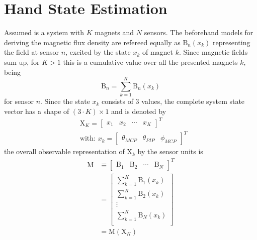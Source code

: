 \section{Hand State Estimation} \label{sec:estimation}

Assumed is a system with $ K $ magnets and $ N $ sensors. The beforehand models for deriving the magnetic flux density are refereed equally as $ \mathrm{B}_{n}(x_{k}) $ representing the field at sensor $ n $, excited by the state $ x_{k} $ of magnet $ k $. Since magnetic fields sum up, for $ K > 1 $ this is a cumulative value over all the presented magnets $ k $, being
\begin{equation}
\mathrm{B}_{n} = \sum_{k=1}^{K} \mathrm{B}_n(x_{k})
\end{equation}
for sensor $ n $. Since the state $ x_{k} $ consists of 3 values, the complete system state vector has a shape of $ (3 \cdot K) \times 1 $ and is denoted by
\begin{equation}
\begin{aligned}
& \mathrm{X}_K = \begin{bmatrix} x_{1} & x_{2} & \cdots & x_{K}  \end{bmatrix}^{T}\\
& \text{with: } x_{k} = \begin{bmatrix} \theta_{MCP} & \theta_{PIP} & \phi_{MCP} \end{bmatrix}^{T}
\end{aligned}
\end{equation}
the overall observable representation of $ \mathrm{X}_{k} $ by the sensor units is 
\begin{equation}
\begin{aligned}
\mathrm{M} &\equiv \begin{bmatrix} {\mathrm{B}}_{1} & {\mathrm{B}}_{2} & \cdots & {\mathrm{B}}_{N} \end{bmatrix}^{T}\\
		&= \begin{bmatrix}
			\sum_{k=1}^{K} \mathrm{B}_1(x_{k})\\
			\sum_{k=1}^{K} \mathrm{B}_2(x_{k})\\
			\vdots \\
		    \sum_{k=1}^{K} \mathrm{B}_N(x_{k})\\
		\end{bmatrix} \\
	    &= \mathrm{M}(\mathrm{X}_K)
\end{aligned}
\end{equation}
